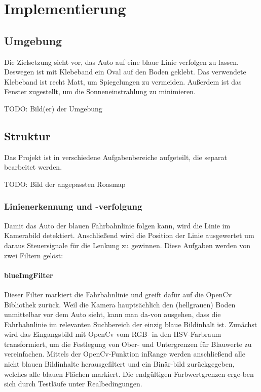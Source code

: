 \documentclass[12pt,a4paper]{report}
\begin{document}
\chapter{Implementierung}

\section{Umgebung}

Die Zielsetzung sieht vor, das Auto auf eine blaue Linie verfolgen zu lassen. Deswegen ist mit Klebeband ein Oval auf den Boden
geklebt. Das verwendete Klebeband ist recht Matt, um Spiegelungen zu vermeiden. Außerdem ist das Fenster zugestellt, um die 
Sonneneinstrahlung zu minimieren.

TODO: Bild(er) der Umgebung

\section{Struktur}

Das Projekt ist in verschiedene Aufgabenbereiche aufgeteilt, die separat bearbeitet werden.

TODO: Bild der angepassten Roasmap

\subsection{Linienerkennung und -verfolgung}
Damit das Auto der blauen Fahrbahnlinie folgen kann, wird die Linie im Kamerabild detektiert. Anschließend wird die Position der Linie ausgewertet um daraus Steuersignale für die Lenkung zu gewinnen. Diese Aufgaben werden von zwei Filtern gelöst:\\

\subsubsection{blueImgFilter}
Dieser Filter markiert die Fahrbahnlinie und greift dafür auf die OpenCv Bibliothek zurück. Weil die Kamera hauptsächlich den 
(hellgrauen) Boden unmittelbar vor dem Auto sieht, kann man da-von ausgehen, dass die Fahrbahnlinie im relevanten Suchbereich der einzig blaue Bildinhalt ist.
Zunächst wird das Eingangsbild mit OpenCv vom RGB- in den HSV-Farbraum transformiert, um die Festlegung von Ober- und Untergrenzen für Blauwerte zu vereinfachen. Mittels der OpenCv-Funktion inRange werden anschließend alle nicht blauen Bildinhalte herausgefiltert und ein Binär-bild zurückgegeben, welches alle blauen Flächen markiert. Die endgültigen Farbwertgrenzen erge-ben sich durch Testläufe unter Realbedingungen.    
\end{document}
